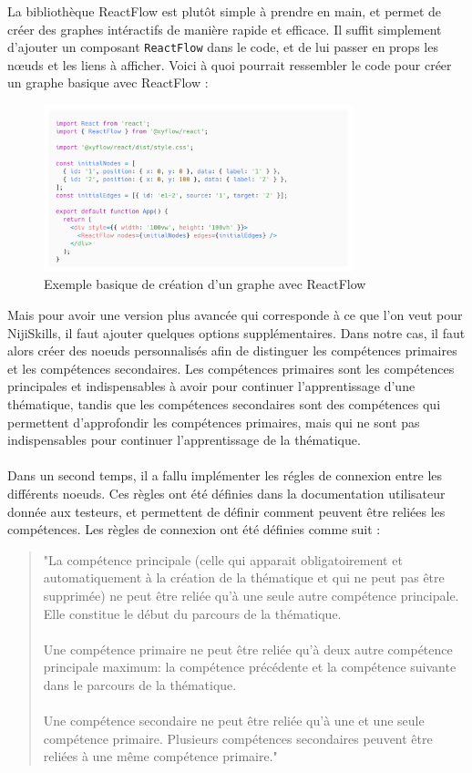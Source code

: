 \documentclass[12pt]{article}
\begin{document}
La bibliothèque ReactFlow est plutôt simple à prendre en main, et permet de créer des graphes intéractifs de manière rapide et efficace. Il suffit simplement d'ajouter un composant \texttt{ReactFlow} dans le code, et de lui passer en props les nœuds et les liens à afficher. Voici à quoi pourrait ressembler le code pour créer un graphe basique avec ReactFlow :
\begin{figure}[H]
  \centering
  \includegraphics[width=0.80\textwidth]{img/reactflow-code.png}
  \caption{Exemple basique de création d'un graphe avec ReactFlow}
\end{figure}
\noindent
Mais pour avoir une version plus avancée qui corresponde à ce que l'on veut pour NijiSkills, il faut ajouter quelques options supplémentaires. Dans notre cas, il faut alors créer des noeuds personnalisés afin de distinguer les compétences primaires et les compétences secondaires. Les compétences primaires sont les compétences principales et indispensables à avoir pour continuer l'apprentissage d'une thématique, tandis que les compétences secondaires sont des compétences qui permettent d'approfondir les compétences primaires, mais qui ne sont pas indispensables pour continuer l'apprentissage de la thématique.
\\\\
Dans un second temps, il a fallu implémenter les régles de connexion entre les différents noeuds. Ces règles ont été définies dans la documentation utilisateur donnée aux testeurs, et permettent de définir comment peuvent être reliées les compétences. Les règles de connexion ont été définies comme suit :
\begin{quote}
  \begin{itshape}
    "La compétence principale (celle qui apparait obligatoirement et automatiquement à la création de la thématique et qui ne peut pas être supprimée) ne peut être reliée qu’à une seule autre compétence principale. Elle constitue le début du parcours de la thématique.
    \\\\
    Une compétence primaire ne peut être reliée qu’à deux autre compétence principale maximum: la compétence précédente et la compétence suivante dans le parcours de la thématique.
    \\\\
    Une compétence secondaire ne peut être reliée qu’à une et une seule compétence primaire. Plusieurs compétences secondaires peuvent être reliées à une même compétence primaire."
  \end{itshape}
\end{quote}
\end{document}
